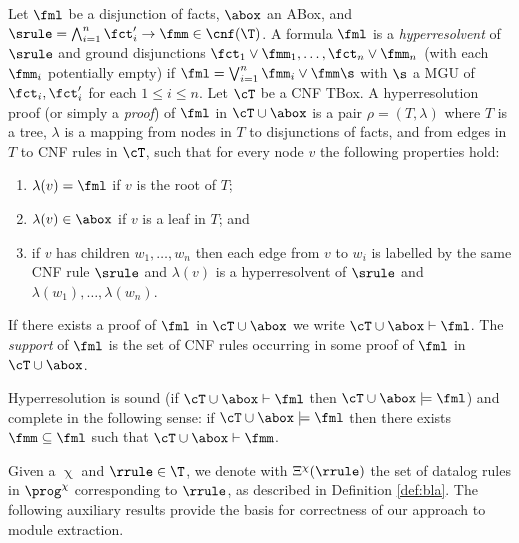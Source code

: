 Let $\fml$ be a disjunction of facts, $\abox$ an ABox,
and $\srule=\bigwedge_{i=1}^n\fct'_i\to\fmm\in\cnf(\T)$.
A formula $\fml$ is a \emph{hyperresolvent} of $\srule$ and ground disjunctions 
\mbox{$\fct_1\vee \fmm_1,\dots,\fct_n\vee \fmm_n$} (with each $\fmm_i$ potentially empty)
if $\fml = \bigvee_{i=1}^n\fmm_i \vee \fmm\s$  with $\s$
a MGU of $\fct_i,\fct'_i$ for each $1 \leq i \leq n$.
Let $\cT$ be a CNF TBox. A hyperresolution proof (or simply a \emph{proof}) 
of $\fml$ in $\cT\cup \abox$ is a pair $\rho = (T, \lambda)$ where $T$ is a tree, 
$\lambda$ is a mapping from nodes in $T$ to disjunctions of  facts,
and from edges in $T$ to CNF rules in $\cT$, such that 
for every node $v$ the following properties hold:
\begin{enumerate}
\item $\lambda(v) = \fml$ if $v$ is the root of $T$;
\item $\lambda(v) \in \abox$ if $v$ is a leaf in $T$;
and 
\item if $v$ has children
$w_1,\dots,w_n$ then each edge from $v$
to $w_i$ is labelled by the same CNF rule $\srule$
and  $\lambda(v)$ is a hyperresolvent of $\srule$
and $\lambda(w_1), \dots, \lambda(w_n)$.
\end{enumerate}
If there exists a proof of $\fml$ in $\cT\cup\abox$ we write $\cT\cup\abox\vdash\fml$.
The \emph{support} of $\fml$ is the set of CNF rules occurring in some proof of $\fml$ in $\cT\cup\abox$.

Hyperresolution is sound (if $\cT\cup\abox\vdash\fml$ then $\cT\cup\abox\models\fml$)
and complete in the following sense:
if $\cT\cup\abox\models \fml$ then there exists $\fmm\subseteq \fml$ such that 
$\cT\cup\abox \vdash \fmm$.

\vspace{4mm}

Given a \bla{} $\upchi$ and $\rrule\in\T$, we denote with $\Xi^{\chi}(\rrule)$ the set of datalog rules in 
$\prog^{\chi}$ corresponding to $\rrule$, as described in Definition \ref{def:bla}.
The following auxiliary results provide the basis for 
correctness of our approach to module extraction.


